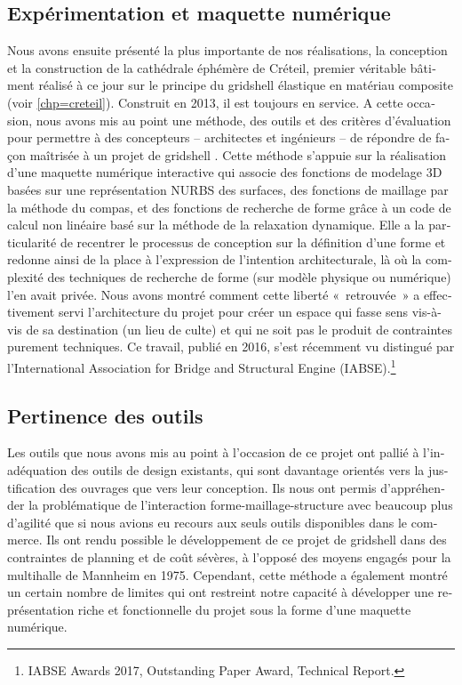 \begin{otherlanguage}{french}
\subsection*{Expérimentation et maquette numérique}

Nous avons ensuite présenté la plus importante de nos réalisations, la conception et la construction de la cathédrale éphémère de Créteil, premier véritable bâtiment réalisé à ce jour sur le principe du gridshell élastique en matériau composite (voir \cref{chp=creteil}). Construit en 2013, il est toujours en service. A cette occasion, nous avons mis au point une méthode, des outils et des critères d'évaluation pour permettre à des concepteurs -- architectes et ingénieurs -- de répondre de façon maîtrisée à un projet de gridshell \cite{DuPeloux2016}. Cette méthode s'appuie sur la réalisation d'une maquette numérique interactive qui associe des fonctions de modelage 3D basées sur une représentation NURBS des surfaces, des fonctions de maillage par la méthode du compas, et des fonctions de recherche de forme grâce à un code de calcul non linéaire basé sur la méthode de la relaxation dynamique. Elle a la particularité de recentrer le processus de conception sur la définition d'une forme et redonne ainsi de la place à l'expression de l'intention architecturale, là où la complexité des techniques de recherche de forme (sur modèle physique ou numérique) l'en avait privée. Nous avons montré comment cette liberté « retrouvée » a effectivement servi l'architecture du projet pour créer un espace qui fasse sens vis-à-vis de sa destination (un lieu de culte) et qui ne soit pas le produit de contraintes purement techniques. Ce travail, publié en 2016, s'est récemment vu distingué par l'International Association for Bridge and Structural Engine (IABSE).\footnote{IABSE Awards 2017, Outstanding Paper Award, Technical Report.}

\subsection*{Pertinence des outils}

Les outils que nous avons mis au point à l'occasion de ce projet ont pallié à l'inadéquation des outils de design existants, qui sont davantage orientés vers la justification des ouvrages que vers leur conception. Ils nous ont permis d'appréhender la problématique de l'interaction forme-maillage-structure avec beaucoup plus d'agilité que si nous avions eu recours aux seuls outils disponibles dans le commerce. Ils ont rendu possible le développement de ce projet de gridshell dans des contraintes de planning et de coût sévères, à l'opposé des moyens engagés pour la multihalle de Mannheim en 1975. Cependant, cette méthode a également montré un certain nombre de limites qui ont restreint notre capacité à développer une représentation riche et fonctionnelle du projet sous la forme d'une maquette numérique.


\end{otherlanguage}
